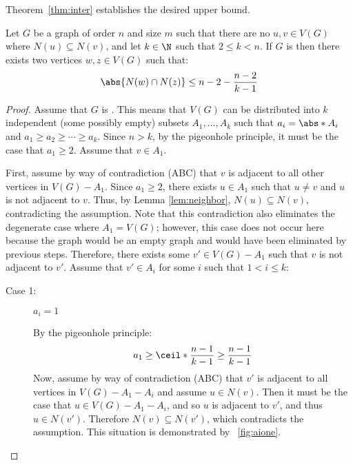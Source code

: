 Theorem~\ref{thm:inter} establishes the desired upper bound.

\begin{theorem}
  \label{thm:inter}
  Let \(G\) be a graph of order \(n\) and size \(m\) such that there are no \(u,v\in V(G)\) where \(N(u)\subseteq
  N(v)\), and let \(k\in\N\) such that \(2\le k<n\).  If \(G\) is  then there exists two vertices
  \(w,z\in V(G)\) such that:
  \[\abs{N(w)\cap N(z)}\le n-2-\frac{n-2}{k-1}\]
\end{theorem}

\begin{proof}
  Assume that \(G\) is .  This means that \(V(G)\) can be distributed into \(k\) independent (some
  possibly empty) subsets \(A_1,\ldots,A_k\) such that \(a_i=\abs*{A_i}\) and \(a_1\ge a_2\ge\cdots\ge a_k\).
  Since \(n>k\), by the pigeonhole principle, it must be the case that \(a_1\ge2\).  Assume that \(v\in A_1\).

  First, assume by way of contradiction (ABC) that \(v\) is adjacent to all other vertices in \(V(G)-A_1\).  Since
  \(a_1\ge2\), there exists \(u\in A_1\) such that \(u\ne v\) and \(u\) is not adjacent to \(v\).  Thus, by Lemma
  \ref{lem:neighbor}, \(N(u)\subseteq N(v)\), contradicting the assumption.  Note that this contradiction also
  eliminates the degenerate case where \(A_1=V(G)\); however, this case does not occur here because the graph would
  be an empty graph and would have been eliminated by previous steps.  Therefore, there exists some \(v'\in
  V(G)-A_1\) such that \(v\) is not adjacent to \(v'\).  Assume that \(v'\in A_i\) for some \(i\) such that
  \(1<i\le k\):

  \begin{description}
  \item [Case 1:] \(a_i=1\)

    By the pigeonhole principle:
    \[a_1\ge\ceil*{\frac{n-1}{k-1}}\ge\frac{n-1}{k-1}\]
    Now, assume by way of contradiction (ABC) that \(v'\) is adjacent to all vertices in \(V(G)-A_1-A_i\) and
    assume \(u\in N(v)\).  Then it must be the case that \(u\in V(G)-A_1-A_i\), and so \(u\) is adjacent to \(v'\),
    and thus \(u\in N(v')\).  Therefore \(N(v)\subseteq N(v')\), which contradicts the assumption.  This situation
    is demonstrated by \figurename~\ref{fig:aione}.


\end{description}
\end{proof}
